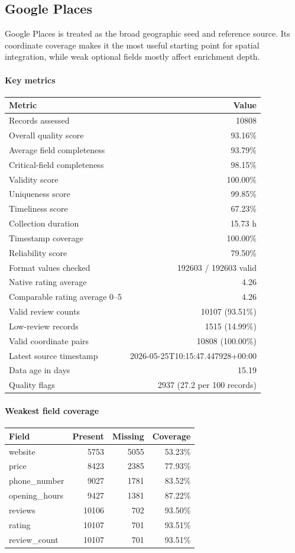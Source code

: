 \subsection{Google Places}

Google Places is treated as the broad geographic seed and reference source. Its coordinate coverage makes it the most useful starting point for spatial integration, while weak optional fields mostly affect enrichment depth.

\paragraph{Key metrics}
\begin{tabular}{lr}
\toprule
Metric & Value \\
\midrule
Records assessed & 10808 \\
Overall quality score & 93.16\% \\
Average field completeness & 93.79\% \\
Critical-field completeness & 98.15\% \\
Validity score & 100.00\% \\
Uniqueness score & 99.85\% \\
Timeliness score & 67.23\% \\
Collection duration & 15.73 h \\
Timestamp coverage & 100.00\% \\
Reliability score & 79.50\% \\
Format values checked & 192603 / 192603 valid \\
Native rating average & 4.26 \\
Comparable rating average 0--5 & 4.26 \\
Valid review counts & 10107 (93.51\%) \\
Low-review records & 1515 (14.99\%) \\
Valid coordinate pairs & 10808 (100.00\%) \\
Latest source timestamp & 2026-05-25T10:15:47.447928+00:00 \\
Data age in days & 15.19 \\
Quality flags & 2937 (27.2 per 100 records) \\
\bottomrule
\end{tabular}

\paragraph{Weakest field coverage}
\begin{tabular}{lrrr}
\toprule
Field & Present & Missing & Coverage \\
\midrule
website & 5753 & 5055 & 53.23\% \\
price & 8423 & 2385 & 77.93\% \\
phone\_number & 9027 & 1781 & 83.52\% \\
opening\_hours & 9427 & 1381 & 87.22\% \\
reviews & 10106 & 702 & 93.50\% \\
rating & 10107 & 701 & 93.51\% \\
review\_count & 10107 & 701 & 93.51\% \\
\bottomrule
\end{tabular}

